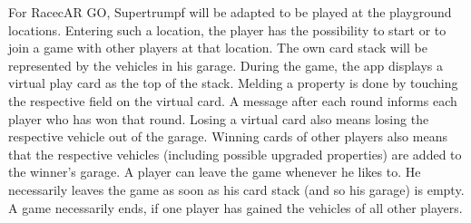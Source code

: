 For RacecAR GO, Supertrumpf will be adapted to be played at the playground locations. Entering such a location, the player has the possibility to start or to join a game with other players at that location. The own card stack will be represented by the vehicles in his garage. During the game, the app displays a virtual play card as the top of the stack. Melding a property is done by touching the respective field on the virtual card. A message after each round informs each player who has won that round. Losing a virtual card also means losing the respective vehicle out of the garage. Winning cards of other players also means that the respective vehicles (including possible upgraded properties) are added to the winner's garage. A player can leave the game whenever he likes to. He necessarily leaves the game as soon as his card stack (and so his garage) is empty. A game necessarily ends, if one player has gained the vehicles of all other players.

